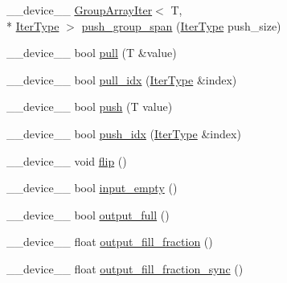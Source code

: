 \begin{DoxyCompactItemize}
\item 
\-\_\-\-\_\-device\-\_\-\-\_\- \hyperlink{structGroupArrayIter}{Group\-Array\-Iter}$<$ T, \\*
\hyperlink{structIOBuffer_ab4571677106318f7fd246c9536292354}{Iter\-Type} $>$ \hyperlink{structIOBuffer_a8d17652830a1c99007270f2562a3b58b}{push\-\_\-group\-\_\-span} (\hyperlink{structIOBuffer_ab4571677106318f7fd246c9536292354}{Iter\-Type} push\-\_\-size)
\item 
\-\_\-\-\_\-device\-\_\-\-\_\- bool \hyperlink{structIOBuffer_a6abd7ec2cc12a2cfef88977c2a07a64b}{pull} (T \&value)
\item 
\-\_\-\-\_\-device\-\_\-\-\_\- bool \hyperlink{structIOBuffer_ae35188cb14fbef4f901a7d3acfa34cfc}{pull\-\_\-idx} (\hyperlink{structIOBuffer_ab4571677106318f7fd246c9536292354}{Iter\-Type} \&index)
\item 
\-\_\-\-\_\-device\-\_\-\-\_\- bool \hyperlink{structIOBuffer_acd8fa802e97bb4004092402a2353539b}{push} (T value)
\item 
\-\_\-\-\_\-device\-\_\-\-\_\- bool \hyperlink{structIOBuffer_a7e5cc3a81b677fd0cc35281355dc54d0}{push\-\_\-idx} (\hyperlink{structIOBuffer_ab4571677106318f7fd246c9536292354}{Iter\-Type} \&index)
\item 
\-\_\-\-\_\-device\-\_\-\-\_\- void \hyperlink{structIOBuffer_a6aa60aed26ade2f70b3659a7e0c5859e}{flip} ()
\item 
\-\_\-\-\_\-device\-\_\-\-\_\- bool \hyperlink{structIOBuffer_aa37ce7a0174b0f1b56e61e2f7e44440f}{input\-\_\-empty} ()
\item 
\-\_\-\-\_\-device\-\_\-\-\_\- bool \hyperlink{structIOBuffer_add5c1f0c7ab74e86e09892a049b9566c}{output\-\_\-full} ()
\item 
\-\_\-\-\_\-device\-\_\-\-\_\- float \hyperlink{structIOBuffer_a0c65e813f8217b5f71cbc550361e0c77}{output\-\_\-fill\-\_\-fraction} ()
\item 
\-\_\-\-\_\-device\-\_\-\-\_\- float \hyperlink{structIOBuffer_ad0de0a595424d38e1bfd3f769671c026}{output\-\_\-fill\-\_\-fraction\-\_\-sync} ()
\end{DoxyCompactItemize}
